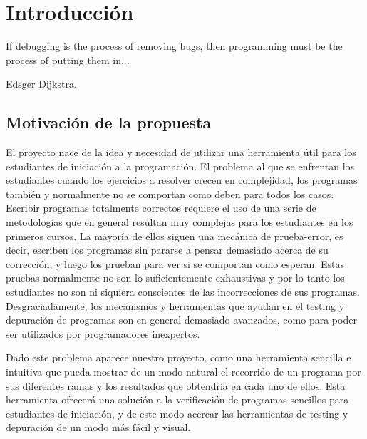 %
%

\chapter{Introducci\'on}

\pagestyle{plain}

\begin{FraseCelebre}
\begin{Frase}
If debugging is the process of removing bugs, then programming must be the process of putting them in...
\end{Frase}
\begin{Fuente}
Edsger Dijkstra.
\end{Fuente}
\end{FraseCelebre}

\section{Motivaci\'on de la propuesta}

El proyecto nace de la idea y necesidad de utilizar una herramienta \'util para los estudiantes de iniciaci\'on a la programaci\'on. El problema al que se enfrentan los estudiantes cuando los ejercicios a resolver crecen en complejidad, los programas tambi\'en y normalmente no se comportan como deben para todos los casos. Escribir programas totalmente correctos requiere el uso de una serie de metodolog\'ias que en general resultan muy complejas para los estudiantes en los primeros cursos. La mayor\'ia de ellos siguen una mec\'anica de prueba-error, es decir, escriben los programas sin pararse a pensar demasiado acerca de su correcci\'on, y luego los prueban para ver si se comportan como esperan. Estas pruebas normalmente no son lo suficientemente exhaustivas y por lo tanto los estudiantes no son ni siquiera conscientes de las incorrecciones de sus programas. Desgraciadamente, los mecanismos y herramientas que ayudan en el testing y depuraci\'on de programas son en general demasiado avanzados, como para poder ser utilizados por programadores inexpertos.

Dado este problema aparece nuestro proyecto, como una herramienta sencilla e intuitiva que pueda mostrar de un modo natural el recorrido de un programa por sus diferentes ramas y los resultados que obtendr\'ia en cada uno de ellos. Esta herramienta ofrecer\'a una soluci\'on a la verificaci\'on de programas sencillos para estudiantes de iniciaci\'on, y de este modo acercar las herramientas de testing y depuraci\'on de un modo m\'as f\'acil y visual.

